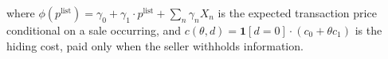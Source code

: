 where $\phi(p^{\text{list}}) = \gamma_0+\gamma_1 \cdot p^{\text{list}}+\sum_n\gamma_n X_n$ is the expected transaction price conditional on a sale occurring, and $c(\theta,d)=\mathbf{1}[d=0]\cdot(c_0+\theta c_1)$ is the hiding cost, paid only when the seller withholds information.
